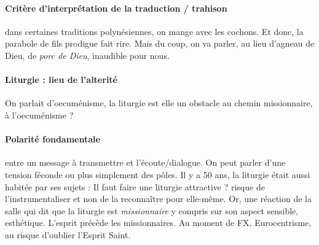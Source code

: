 \paragraph{Critère d'interprétation de la traduction / trahison} dans certaines traditions polynésiennes, on mange avec les cochons. Et donc, la parabole de fils prodigue fait rire. Mais du coup, on va parler, au lieu d'agneau de Dieu, de \textit{porc de Dieu}, inaudible pour nous.


\paragraph{Liturgie : lieu de l'alterité} On parlait d'oecuménisme, la liturgie est elle un obstacle au chemin missionnaire, à l'oecuménisme ? 
\paragraph{Polarité fondamentale} entre un message à transmettre  et l'écoute/dialogue. On peut parler d'une tension féconde ou plus simplement des pôles. Il y a 50 ans, la liturgie était aussi habitée par ses sujets : Il faut faire une liturgie attractive ? risque de l'instrumentaliser et non de la reconnaître pour elle-même. Or, une réaction de la salle qui dit que la liturgie est \textit{missionnaire} y compris sur son aspect sensible, esthétique. L'esprit précède les missionnaires. Au moment de FX, Eurocentrisme, au risque d'oublier l'Esprit Saint. 
